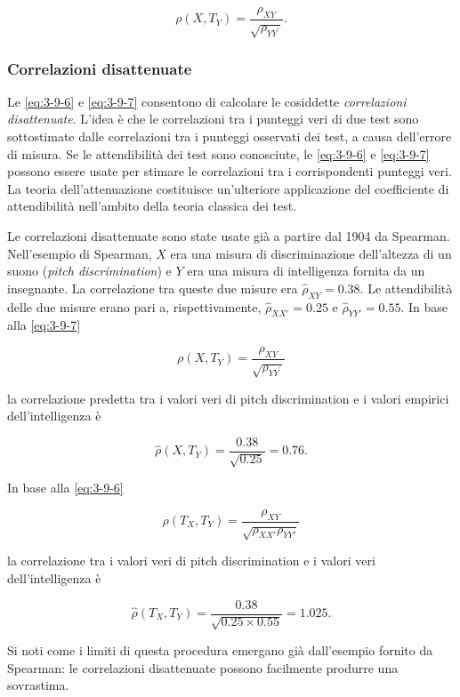 \documentclass[
  11pt,
]{krantz}
\theoremstyle{definition}
\theoremstyle{definition}
\theoremstyle{definition}
\theoremstyle{definition}
\theoremstyle{remark}
\begin{document}
\begin{equation}
\rho(X, T_Y)  = \frac{\rho_{XY}}{\sqrt{\rho_{YY^\prime}}}.
\label{eq:3-9-7}
\end{equation}

\hypertarget{correlazioni-disattenuate}{%
\subsubsection{Correlazioni disattenuate}\label{correlazioni-disattenuate}}

Le \eqref{eq:3-9-6} e \eqref{eq:3-9-7} consentono di calcolare le cosiddette \emph{correlazioni disattenuate}. L'idea è che le correlazioni tra i punteggi veri di due test sono sottostimate dalle correlazioni tra i punteggi osservati dei test, a causa dell'errore di misura. Se le attendibilità dei test sono conosciute, le \eqref{eq:3-9-6} e \eqref{eq:3-9-7} possono essere usate per stimare le correlazioni tra i corrispondenti punteggi veri. La teoria dell'attenuazione costituisce un'ulteriore applicazione del coefficiente di attendibilità nell'ambito della teoria classica dei test.

Le correlazioni disattenuate sono state usate già a partire dal 1904 da Spearman. Nell'esempio di Spearman, \(X\) era una misura di discriminazione dell'altezza di un suono (\emph{pitch discrimination}) e \(Y\) era una misura di intelligenza fornita da un insegnante. La correlazione tra queste due misure era \(\hat{\rho}_{XY}=0.38\). Le attendibilità delle due misure erano pari a, rispettivamente, \(\hat{\rho}_{XX'}= 0.25\) e \(\hat{\rho}_{YY'}= 0.55\). In base alla \eqref{eq:3-9-7}

\[
\rho(X, T_Y)  = \frac{\rho_{XY}}{\sqrt{\rho_{YY^\prime}}}
\]

la correlazione predetta tra i valori veri di pitch discrimination e i valori empirici dell'intelligenza è

\[
\hat{\rho}(X, T_Y)  =\frac{0.38}{\sqrt{0.25}}=0.76.
\]

In base alla \eqref{eq:3-9-6}

\[\rho(T_X, T_Y)  = \frac{\rho_{XY}}{\sqrt{\rho_{XX'} \rho_{YY'}}}\]

la correlazione tra i valori veri di pitch discrimination e i valori veri dell'intelligenza è

\[\hat{\rho}(T_X, T_Y)  =\frac{0.38}{\sqrt{0.25 \times 0.55}}=1.025.\]

Si noti come i limiti di questa procedura emergano già dall'esempio fornito da Spearman: le correlazioni disattenuate possono facilmente produrre una sovrastima.
\end{document}
